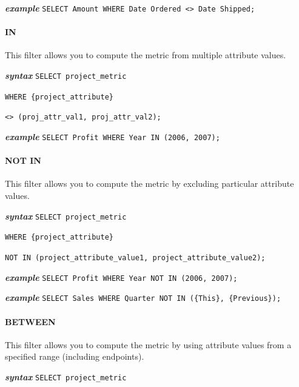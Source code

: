 \documentclass[a4paper, 12pt, titlepage, fleqn]{article}
\begin{document}
\textbf{\emph{example}}  \hspace{.9cm}\verb=SELECT Amount WHERE Date Ordered <> Date Shipped;=

\paragraph*{IN}
This filter allows you to compute the metric from multiple attribute values.

\textbf{\emph{syntax}}  \hspace{.9cm}\verb=SELECT project_metric=

\hspace{2.2cm}\verb=WHERE {project_attribute}=

\hspace{2.2cm}\verb=<> (proj_attr_val1, proj_attr_val2);=

\textbf{\emph{example}}  \hspace{.9cm}\verb=SELECT Profit WHERE Year IN (2006, 2007);=


\paragraph*{NOT IN}
This filter allows you to compute the metric by excluding particular attribute values.

\textbf{\emph{syntax}}  \hspace{.9cm}\verb=SELECT project_metric=

\hspace{2.2cm}\verb=WHERE {project_attribute}=

\hspace{2.2cm}\verb=NOT IN (project_attribute_value1, project_attribute_value2);=

\textbf{\emph{example}}  \hspace{.9cm}\verb=SELECT Profit WHERE Year NOT IN (2006, 2007);=

\textbf{\emph{example}}  \hspace{.9cm}\verb=SELECT Sales WHERE Quarter NOT IN ({This}, {Previous});=

\paragraph*{BETWEEN} This filter allows you to compute the metric by using attribute values from a specified range (including endpoints).

\textbf{\emph{syntax}}  \hspace{.9cm}\verb=SELECT project_metric=
\end{document}
